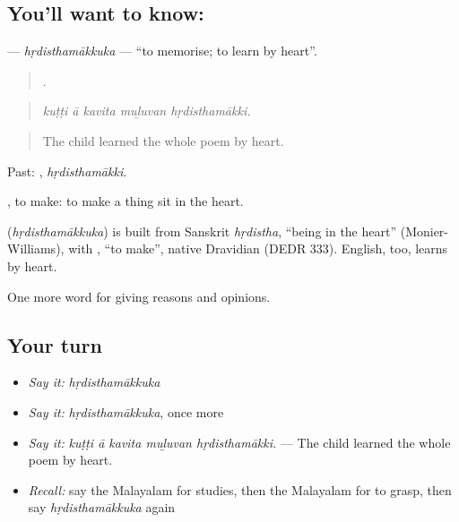 \subsection*{You'll want to know: }
\textbf{} — \emph{hṛdisthamākkuka} — \textquotedblleft{}to memorise; to learn by heart\textquotedblright{}.

\begin{quote}
    .
\end{quote}

\begin{quote}
\emph{kuṭṭi ā kavita muḻuvan hṛdisthamākki.}
\end{quote}

\begin{quote}
The child learned the whole poem by heart.
\end{quote}

Past: , \emph{hṛdisthamākki}.

, to make: to make a thing sit in the heart.

\begin{cousinweb}
\textbf{} (\emph{hṛdisthamākkuka}) is built from Sanskrit \emph{hṛdistha}, \textquotedblleft{}being in the heart\textquotedblright{} (Monier-Williams), with , \textquotedblleft{}to make\textquotedblright{}, native Dravidian (DEDR 333). English, too, learns by heart.
\end{cousinweb}

\begin{grammarlens}[title={What you've built}]
One more word for giving reasons and opinions.
\end{grammarlens}

\subsection*{Your turn}
\begin{itemize}
\raggedright
  \item \emph{Say it:} \emph{hṛdisthamākkuka}
  \item \emph{Say it:} \emph{hṛdisthamākkuka}, once more
  \item \emph{Say it:} \emph{kuṭṭi ā kavita muḻuvan hṛdisthamākki.} — The child learned the whole poem by heart.
  \item \emph{Recall:} say the Malayalam for studies, then the Malayalam for to grasp, then say \emph{hṛdisthamākkuka} again
\end{itemize}


